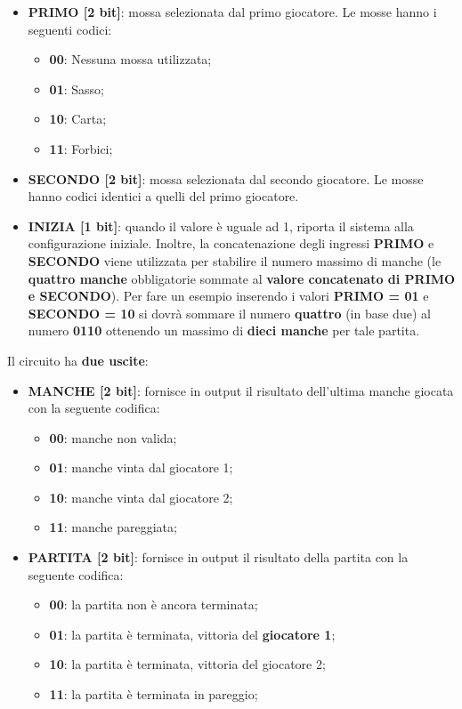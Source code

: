 \documentclass[a4paper]{article}
\begin{document}
\begin{itemize}
	\item \textbf{PRIMO [2 bit]}: mossa selezionata dal primo giocatore. Le mosse hanno i seguenti codici:
	      \begin{itemize}
		      \item \textbf{00}: Nessuna mossa utilizzata;
		      \item \textbf{01}: Sasso;
		      \item \textbf{10}: Carta;
		      \item \textbf{11}: Forbici;
	      \end{itemize}
	\item \textbf{SECONDO [2 bit]}: mossa selezionata dal secondo giocatore. Le mosse hanno codici identici a quelli del primo giocatore.
	\item \textbf{INIZIA [1 bit]}: quando il valore è uguale ad 1, riporta il sistema alla configurazione iniziale. Inoltre, la concatenazione degli ingressi \textbf{PRIMO} e \textbf{SECONDO} viene utilizzata per stabilire il numero massimo di manche (le \textbf{quattro manche} obbligatorie sommate al \textbf{valore concatenato di PRIMO e SECONDO}).
	      Per fare un esempio inserendo i valori \textbf{PRIMO = 01} e \textbf{SECONDO = 10} si dovrà sommare il numero \textbf{quattro} (in base due) al numero \textbf{0110} ottenendo un massimo di \textbf{dieci manche} per tale partita.
\end{itemize}
Il circuito ha \textbf{due uscite}:
\begin{itemize}
	\item \textbf{MANCHE [2 bit]}: fornisce in output il risultato dell'ultima manche giocata con la seguente codifica:
	      \begin{itemize}
		      \item \textbf{00}: manche non valida;
		      \item \textbf{01}: manche vinta dal giocatore 1;
		      \item \textbf{10}: manche vinta dal giocatore 2;
		      \item \textbf{11}: manche pareggiata;
	      \end{itemize}
	\item \textbf{PARTITA [2 bit]}: fornisce in output il risultato della partita con la seguente codifica:
	      \begin{itemize}
		      \item \textbf{00}: la partita non è ancora terminata;
		      \item \textbf{01}: la partita è terminata, vittoria del \textbf{giocatore 1};
		      \item \textbf{10}: la partita è terminata, vittoria del giocatore 2;
		      \item \textbf{11}: la partita è terminata in pareggio;
	      \end{itemize}
\end{itemize}
\end{document}
